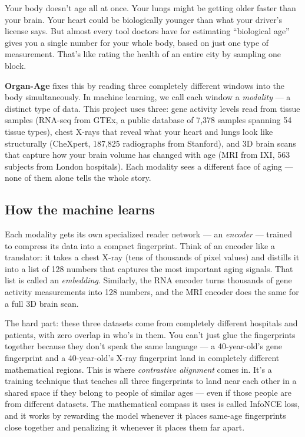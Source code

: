 \documentclass[11pt]{article}
\begin{document}
\begin{tcolorbox}[L1box]

Your body doesn't age all at once. Your lungs might be getting older faster than your brain. Your heart could be biologically younger than what your driver's license says. But almost every tool doctors have for estimating ``biological age'' gives you a single number for your whole body, based on just one type of measurement. That's like rating the health of an entire city by sampling one block.

\textbf{Organ-Age} fixes this by reading three completely different windows into the body simultaneously. In machine learning, we call each window a \textit{modality} --- a distinct type of data. This project uses three: gene activity levels read from tissue samples (RNA-seq from GTEx, a public database of 7,378 samples spanning 54 tissue types), chest X-rays that reveal what your heart and lungs look like structurally (CheXpert, 187,825 radiographs from Stanford), and 3D brain scans that capture how your brain volume has changed with age (MRI from IXI, 563 subjects from London hospitals). Each modality sees a different face of aging --- none of them alone tells the whole story.

\subsection{How the machine learns}

Each modality gets its own specialized reader network --- an \textit{encoder} --- trained to compress its data into a compact fingerprint. Think of an encoder like a translator: it takes a chest X-ray (tens of thousands of pixel values) and distills it into a list of 128 numbers that captures the most important aging signals. That list is called an \textit{embedding}. Similarly, the RNA encoder turns thousands of gene activity measurements into 128 numbers, and the MRI encoder does the same for a full 3D brain scan.

The hard part: these three datasets come from completely different hospitals and patients, with zero overlap in who's in them. You can't just glue the fingerprints together because they don't speak the same language --- a 40-year-old's gene fingerprint and a 40-year-old's X-ray fingerprint land in completely different mathematical regions. This is where \textit{contrastive alignment} comes in. It's a training technique that teaches all three fingerprints to land near each other in a shared space if they belong to people of similar ages --- even if those people are from different datasets. The mathematical compass it uses is called InfoNCE loss, and it works by rewarding the model whenever it places same-age fingerprints close together and penalizing it whenever it places them far apart.


\end{tcolorbox}
\end{document}
